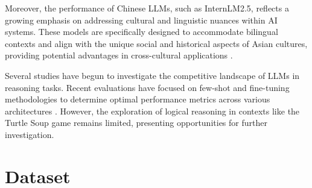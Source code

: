 \documentclass[conference]{IEEEtran}
\begin{document}

Moreover, the performance of Chinese LLMs, such as InternLM2.5, reflects a growing emphasis on addressing cultural and linguistic nuances within AI systems. These models are specifically designed to accommodate bilingual contexts and align with the unique social and historical aspects of Asian cultures, providing potential advantages in cross-cultural applications \cite{zhang2024mme}.

Several studies have begun to investigate the competitive landscape of LLMs in reasoning tasks. Recent evaluations have focused on few-shot and fine-tuning methodologies to determine optimal performance metrics across various architectures \cite{winata2021language}. However, the exploration of logical reasoning in contexts like the Turtle Soup game remains limited, presenting opportunities for further investigation.

\section{Dataset}
\end{document}
